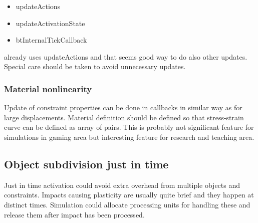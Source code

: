 \begin{itemize}
\item updateActions
\item updateActivationState
\item btInternalTickCallback
\end{itemize}

\demolisher already uses updateActions and that seems 
good way to do also other updates. Special care should be taken to avoid unnecessary updates.

\subsubsection{Material nonlinearity}
Update of constraint properties can be done in callbacks in similar way as for large displacements.
Material definition should be defined so that stress-strain curve can be defined as array of pairs.
This is probably not significant feature for simulations in gaming area but interesting feature for research and teaching area.

\subsection{Object subdivision just in time}
Just in time activation could avoid extra overhead from multiple objects and constraints.
Impacts causing plasticity are usually quite brief and they happen at distinct times. 
Simulation could allocate processing units for handling these and release them after impact has been processed.

\cleardoublepage

